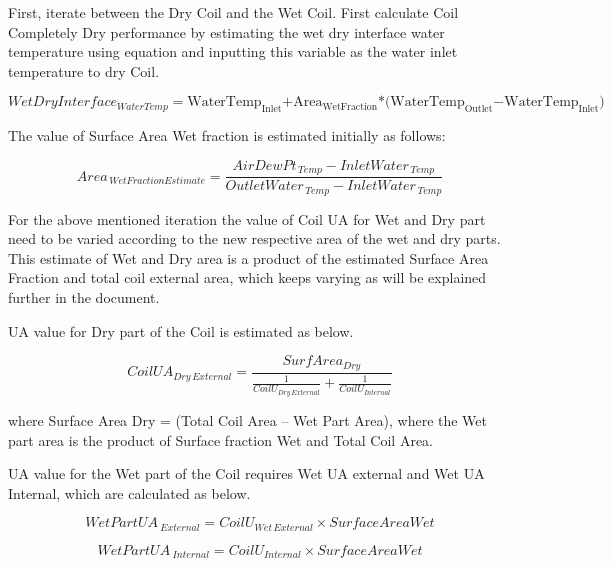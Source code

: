 First, iterate between the Dry Coil and the Wet Coil. First calculate Coil Completely Dry performance by estimating the wet dry interface water temperature using equation and inputting this variable as the water inlet temperature to dry Coil.

\begin{equation}
  WetDryInterfac{e_{WaterTemp}} = {\mathrm{WaterTem}}{{\mathrm{p}}_{{\mathrm{Inlet}}}}{\mathrm{ + Are}}{{\mathrm{a}}_{{\mathrm{WetFraction}}}}{\mathrm{*(WaterTem}}{{\mathrm{p}}_{{\mathrm{Outlet}}}}{\mathrm{ - WaterTem}}{{\mathrm{p}}_{{\mathrm{Inlet}}}}{\mathrm{)}}
\end{equation}

The value of Surface Area Wet fraction is estimated initially as follows:

\begin{equation}
Are{a_{\,WetFractionEstimate}} = \frac{{AirDewP{t_{\,Temp}} - InletWate{r_{\,Temp}}}}{{OutletWate{r_{\,Temp}} - InletWate{r_{\,Temp}}}}
\label{eq:AreaWetFractionEstimate}
\end{equation}

For the above mentioned iteration the value of Coil UA for Wet and Dry part need to be varied according to the new respective area of the wet and dry parts. This estimate of Wet and Dry area is a product of the estimated Surface Area Fraction and total coil external area, which keeps varying as will be explained further in the document.

UA value for Dry part of the Coil is estimated as below.

\begin{equation}
CoilU{A_{Dry\,External}} = \frac{{SurfAre{a_{Dry}}}}{{\frac{1}{{Coil{U_{Dry\,External}}}} + \frac{1}{{Coil{U_{Internal}}}}}}
\end{equation}

where Surface Area Dry = (Total Coil Area -- Wet Part Area), where the Wet part area is the product of Surface fraction Wet and Total Coil Area.

UA value for the Wet part of the Coil requires Wet UA external and Wet UA Internal, which are calculated as below.

\begin{equation}
WetPartUA{\,_{External}} = Coil{U_{Wet\,External}} \times SurfaceAreaWet
\end{equation}

\begin{equation}
WetPartUA{\,_{Internal}} = Coil{U_{Internal}} \times SurfaceAreaWet
\end{equation}

